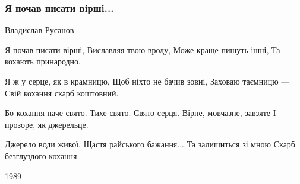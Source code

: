  
 
 

\subsubsection{Я почав писати вiршi...}
\label{sec:poetry.rus.dnr.vladislav_rusanov.ja_pochav_pysaty_virshi}

Владислав Русанов

Я почав писати вірші,
Виславляя твою вроду,
Може краще пишуть інші,
Та кохають принародно.

Я ж у серце, як в крамницю,
Щоб ніхто не бачив зовні,
Заховаю таємницю —
Свій кохання скарб коштовний.

Бо кохання наче свято.
Тихе свято. Свято серця.
Вірне, мовчазне, завзяте
І прозоре, як джерельце.

Джерело води живої,
Щастя райського бажання...
Та залишиться зі мною
Скарб безглуздого кохання.

1989 
